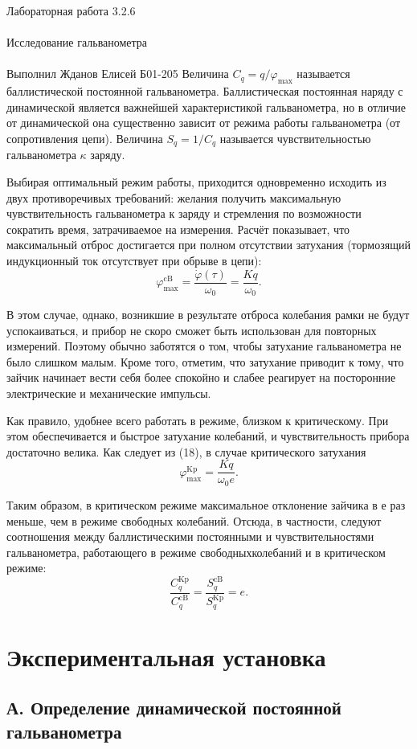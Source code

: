 \documentclass{astroedu-lab}
\begin{document}
\begin{problem}{\huge Лабораторная работа 3.2.6\\\\Исследование гальванометра\\\\Выполнил Жданов Елисей Б01-205}
Величина $C_q=q / \varphi_{\max }$ называется баллистической постоянной гальванометра. Баллистическая постоянная наряду с динамической является важнейшей характеристикой гальванометра, но в отличие от динамической она существенно зависит от режима работы гальванометра (от сопротивления цепи). Величина $S_q=1 / C_q$ называется чувствительностью гальванометра $\kappa$ заряду.

Выбирая оптимальный режим работы, приходится одновременно исходить из двух противоречивых требований: желания получить максимальную чувствительность гальванометра к заряду и стремления по возможности сократить время, затрачиваемое на измерения. Расчёт показывает, что максимальный отброс достигается при полном отсутствии затухания (тормозящий индукционный ток отсутствует при обрыве в цепи):
$$
\varphi_{\max }^{\mathrm{cB}}=\frac{\dot{\varphi}(\tau)}{\omega_0}=\frac{K q}{\omega_0} .
$$

В этом случае, однако, возникшие в результате отброса колебания рамки не будут успокаиваться, и прибор не скоро сможет быть использован для повторных измерений. Поэтому обычно заботятся о том, чтобы затухание гальванометра не было слишком малым. Кроме того, отметим, что затухание приводит к тому, что зайчик начинает вести себя более спокойно и слабее реагирует на посторонние электрические и механические импульсы.

Как правило, удобнее всего работать в режиме, близком к критическому. При этом обеспечивается и быстрое затухание колебаний, и чувствительность прибора достаточно велика. Как следует из (18), в случае критического затухания
$$
\varphi_{\max }^{\mathrm{Kp}}=\frac{K q}{\omega_0 e} .
$$

Таким образом, в критическом режиме максимальное отклонение зайчика в $е$ раз меньше, чем в режиме свободных колебаний. Отсюда, в частности, следуют соотношения между баллистическими постоянными и чувствительностями гальванометра, работающего в режиме свободныхколебаний и в критическом режиме:
$$
\frac{C_q^{\mathrm{Kp}}}{C_q^{\mathrm{cB}}}=\frac{S_q^{\mathrm{cB}}}{S_q^{\mathrm{Kp}}}=e .
$$



\section{Экспериментальная установка}

\subsection{А. Определение динамической постоянной гальванометра}


\end{problem}
\end{document}
